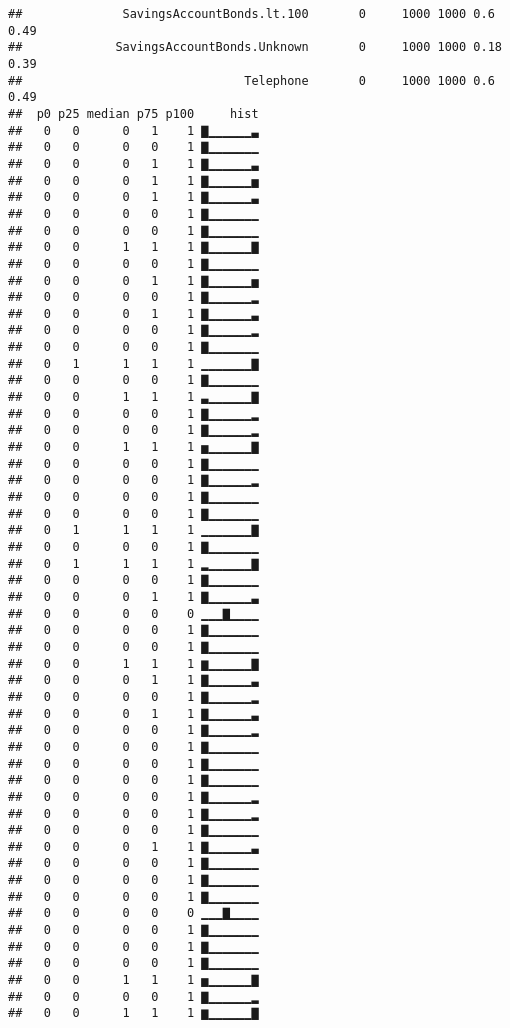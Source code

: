 \documentclass[]{article}
\begin{document}
\begin{verbatim}
##              SavingsAccountBonds.lt.100       0     1000 1000 0.6   0.49 
##             SavingsAccountBonds.Unknown       0     1000 1000 0.18  0.39 
##                               Telephone       0     1000 1000 0.6   0.49 
##  p0 p25 median p75 p100     hist
##   0   0      0   1    1 ▇▁▁▁▁▁▁▃
##   0   0      0   0    1 ▇▁▁▁▁▁▁▁
##   0   0      0   1    1 ▇▁▁▁▁▁▁▃
##   0   0      0   1    1 ▇▁▁▁▁▁▁▅
##   0   0      0   1    1 ▇▁▁▁▁▁▁▃
##   0   0      0   0    1 ▇▁▁▁▁▁▁▁
##   0   0      0   0    1 ▇▁▁▁▁▁▁▁
##   0   0      1   1    1 ▇▁▁▁▁▁▁▇
##   0   0      0   0    1 ▇▁▁▁▁▁▁▁
##   0   0      0   1    1 ▇▁▁▁▁▁▁▅
##   0   0      0   0    1 ▇▁▁▁▁▁▁▂
##   0   0      0   1    1 ▇▁▁▁▁▁▁▃
##   0   0      0   0    1 ▇▁▁▁▁▁▁▂
##   0   0      0   0    1 ▇▁▁▁▁▁▁▁
##   0   1      1   1    1 ▁▁▁▁▁▁▁▇
##   0   0      0   0    1 ▇▁▁▁▁▁▁▁
##   0   0      1   1    1 ▃▁▁▁▁▁▁▇
##   0   0      0   0    1 ▇▁▁▁▁▁▁▂
##   0   0      0   0    1 ▇▁▁▁▁▁▁▂
##   0   0      1   1    1 ▅▁▁▁▁▁▁▇
##   0   0      0   0    1 ▇▁▁▁▁▁▁▁
##   0   0      0   0    1 ▇▁▁▁▁▁▁▂
##   0   0      0   0    1 ▇▁▁▁▁▁▁▁
##   0   0      0   0    1 ▇▁▁▁▁▁▁▁
##   0   1      1   1    1 ▁▁▁▁▁▁▁▇
##   0   0      0   0    1 ▇▁▁▁▁▁▁▁
##   0   1      1   1    1 ▂▁▁▁▁▁▁▇
##   0   0      0   0    1 ▇▁▁▁▁▁▁▁
##   0   0      0   1    1 ▇▁▁▁▁▁▁▃
##   0   0      0   0    0 ▁▁▁▇▁▁▁▁
##   0   0      0   0    1 ▇▁▁▁▁▁▁▁
##   0   0      0   0    1 ▇▁▁▁▁▁▁▁
##   0   0      1   1    1 ▆▁▁▁▁▁▁▇
##   0   0      0   1    1 ▇▁▁▁▁▁▁▃
##   0   0      0   0    1 ▇▁▁▁▁▁▁▂
##   0   0      0   1    1 ▇▁▁▁▁▁▁▃
##   0   0      0   0    1 ▇▁▁▁▁▁▁▂
##   0   0      0   0    1 ▇▁▁▁▁▁▁▁
##   0   0      0   0    1 ▇▁▁▁▁▁▁▁
##   0   0      0   0    1 ▇▁▁▁▁▁▁▁
##   0   0      0   0    1 ▇▁▁▁▁▁▁▂
##   0   0      0   0    1 ▇▁▁▁▁▁▁▂
##   0   0      0   0    1 ▇▁▁▁▁▁▁▁
##   0   0      0   1    1 ▇▁▁▁▁▁▁▃
##   0   0      0   0    1 ▇▁▁▁▁▁▁▁
##   0   0      0   0    1 ▇▁▁▁▁▁▁▁
##   0   0      0   0    1 ▇▁▁▁▁▁▁▁
##   0   0      0   0    0 ▁▁▁▇▁▁▁▁
##   0   0      0   0    1 ▇▁▁▁▁▁▁▁
##   0   0      0   0    1 ▇▁▁▁▁▁▁▁
##   0   0      0   0    1 ▇▁▁▁▁▁▁▁
##   0   0      1   1    1 ▅▁▁▁▁▁▁▇
##   0   0      0   0    1 ▇▁▁▁▁▁▁▂
##   0   0      1   1    1 ▆▁▁▁▁▁▁▇
\end{verbatim}
\end{document}

